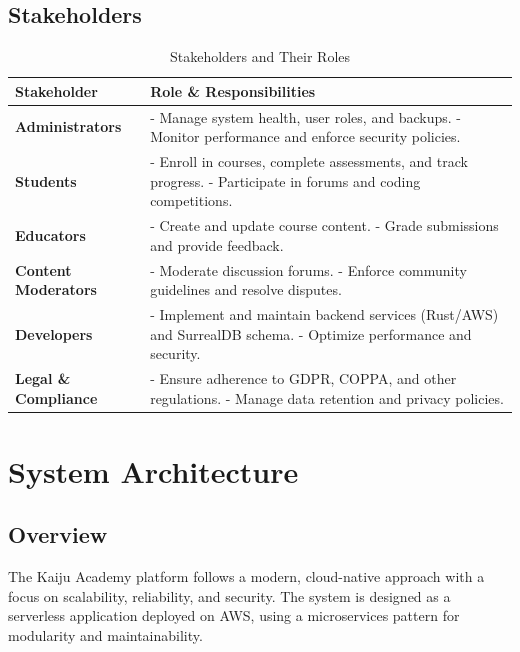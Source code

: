 \documentclass[a4paper, 11pt]{scrreprt}
\begin{document}
\section{Stakeholders}
\begin{table}
    \centering
    \begin{tabularx}{\textwidth}{|l|X|}
        \hline
        \textbf{Stakeholder} & \textbf{Role \& Responsibilities} \\
        \hline
        \textbf{Administrators} & - Manage system health, user roles, and backups. \newline - Monitor performance and enforce security policies. \\
        \hline
        \textbf{Students} & - Enroll in courses, complete assessments, and track progress. \newline - Participate in forums and coding competitions. \\
        \hline
        \textbf{Educators} & - Create and update course content. \newline - Grade submissions and provide feedback. \\
        \hline
        \textbf{Content Moderators} & - Moderate discussion forums. \newline - Enforce community guidelines and resolve disputes. \\
        \hline
        \textbf{Developers} & - Implement and maintain backend services (Rust/AWS) and SurrealDB schema. \newline - Optimize performance and security. \\
        \hline
        \textbf{Legal \& Compliance} & - Ensure adherence to GDPR, COPPA, and other regulations. \newline - Manage data retention and privacy policies. \\
        \hline
    \end{tabularx}
    \caption{Stakeholders and Their Roles}
\end{table}

\chapter{System Architecture}

\section{Overview}
The Kaiju Academy platform follows a modern, cloud-native approach with a focus on scalability, reliability, and security. The system is designed as a serverless application deployed on AWS, using a microservices pattern for modularity and maintainability.
\end{document}
